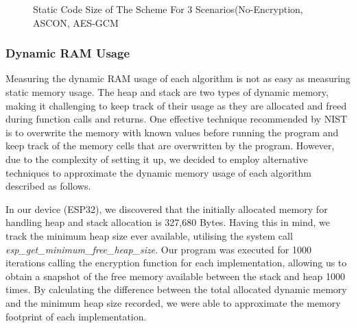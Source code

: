 \begin{figure}[H]
    \centering
    
    \resizebox{0.45\textwidth}{!}
    {
    }
    \caption{Static Code Size of The Scheme For 3 Scenarios(No-Encryption, ASCON, AES-GCM}
\label{Fig:codesize}
\end{figure}



\subsubsection*{Dynamic RAM Usage}


Measuring the dynamic RAM usage of each algorithm is not as easy as measuring static memory usage. The heap and stack are two types of dynamic memory, making it challenging to keep track of their usage as they are allocated and freed during function calls and returns. One effective technique recommended by NIST is to overwrite the memory with known values before running the program and keep track of the memory cells that are overwritten by the program. However, due to the complexity of setting it up,  we decided to employ alternative techniques to approximate the dynamic memory usage of each algorithm described as follows.



In our device (ESP32), we discovered that the initially allocated memory for handling heap and stack allocation is 327,680 Bytes. Having this in mind, we track the minimum heap size ever available, utilising the system call \textit{esp\_get\_minimum\_free\_heap\_size}. Our program was executed for 1000 iterations calling the encryption function for each implementation, allowing us to obtain a snapshot of the free memory available between the stack and heap 1000 times. By calculating the difference between the total allocated dynamic memory and the minimum heap size recorded, we were able to approximate the memory footprint of each implementation.

